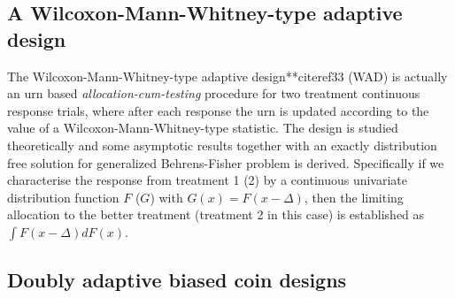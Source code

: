 \subsection{A Wilcoxon-Mann-Whitney-type adaptive design}

The Wilcoxon-Mann-Whitney-type adaptive design**citeref{33} (WAD) is actually an urn based \textit{allocation-cum-testing} procedure for
two treatment continuous response trials, where after each response the urn is updated according to the value of a Wilcoxon-Mann-Whitney-type
statistic. The design is studied theoretically and some asymptotic
results together with an exactly distribution free solution for
generalized Behrens-Fisher problem is derived. Specifically if we
characterise the response from treatment 1 (2) by a continuous univariate
distribution function $F$ ($G$) with $G(x)=F(x-\Delta)$, then the limiting allocation to the better treatment (treatment 2 in this case) is established as $\int F(x-\Delta)dF(x)$.

\subsection{Doubly adaptive biased coin designs}

